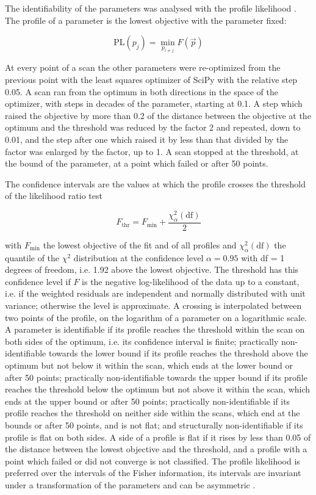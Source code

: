 \documentclass{article}
\begin{document}
The identifiability of the parameters was analysed with the profile likelihood \cite{Raue2009,Kreutz2013}. The profile of a parameter is the lowest objective with the parameter fixed:

\begin{equation}
\mathrm{PL}(p_j) = \min_{p_{l \neq j}} F(\vec{p})
\end{equation}

At every point of a scan the other parameters were re-optimized from the previous point with the least squares optimizer of SciPy with the relative step 0.05. A scan ran from the optimum in both directions in the space of the optimizer, with steps in decades of the parameter, starting at 0.1. A step which raised the objective by more than 0.2 of the distance between the objective at the optimum and the threshold was reduced by the factor 2 and repeated, down to 0.01, and the step after one which raised it by less than that divided by the factor was enlarged by the factor, up to 1. A scan stopped at the threshold, at the bound of the parameter, at a point which failed or after 50 points.

The confidence intervals are the values at which the profile crosses the threshold of the likelihood ratio test

\begin{equation}
F_{\mathrm{thr}} = F_{\min} + \frac{\chi^2_{\alpha}(\mathrm{df})}{2}
\end{equation}

with $F_{\min}$ the lowest objective of the fit and of all profiles and $\chi^2_{\alpha}(\mathrm{df})$ the quantile of the $\chi^2$ distribution at the confidence level $\alpha = 0.95$ with df = 1 degrees of freedom, i.e. 1.92 above the lowest objective. The threshold has this confidence level if $F$ is the negative log-likelihood of the data up to a constant, i.e. if the weighted residuals are independent and normally distributed with unit variance; otherwise the level is approximate. A crossing is interpolated between two points of the profile, on the logarithm of a parameter on a logarithmic scale. A parameter is identifiable if its profile reaches the threshold within the scan on both sides of the optimum, i.e. its confidence interval is finite; practically non-identifiable towards the lower bound if its profile reaches the threshold above the optimum but not below it within the scan, which ends at the lower bound or after 50 points; practically non-identifiable towards the upper bound if its profile reaches the threshold below the optimum but not above it within the scan, which ends at the upper bound or after 50 points; practically non-identifiable if its profile reaches the threshold on neither side within the scans, which end at the bounds or after 50 points, and is not flat; and structurally non-identifiable if its profile is flat on both sides. A side of a profile is flat if it rises by less than 0.05 of the distance between the lowest objective and the threshold, and a profile with a point which failed or did not converge is not classified. The profile likelihood is preferred over the intervals of the Fisher information, its intervals are invariant under a transformation of the parameters and can be asymmetric \cite{Wieland2021}.
\end{document}
